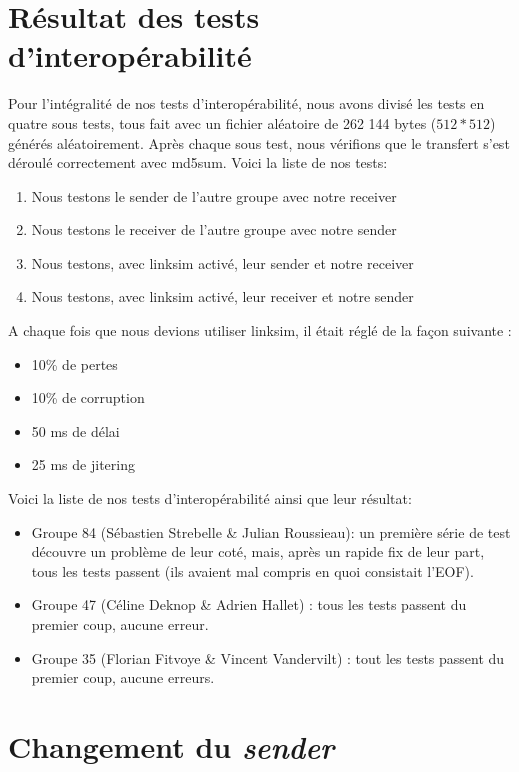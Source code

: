 \documentclass[12pt,notitlepage]{report}
\begin{document}
\begin{appendices}
\section{Résultat des tests d'interopérabilité}
	Pour l'intégralité de nos tests d'interopérabilité, nous avons divisé les tests en quatre sous tests, tous fait avec un fichier aléatoire de 262 144 bytes ($512*512$) générés aléatoirement. Après chaque sous test, nous vérifions que le transfert s'est déroulé correctement avec md5sum. Voici la liste de nos tests:
\begin{enumerate}
\item Nous testons le sender de l'autre groupe avec notre receiver
\item Nous testons le receiver de l'autre groupe avec notre sender
\item Nous testons, avec linksim activé, leur sender et notre receiver
\item Nous testons, avec linksim activé, leur receiver et notre sender
\end{enumerate}	 
	A chaque fois que nous devions utiliser linksim, il était réglé de la façon suivante : 
	\begin{itemize}
	\item 10\% de pertes
	\item 10\% de corruption
	\item 50 ms de délai
	\item 25 ms de jitering
	\end{itemize}

Voici la liste de nos tests  d'interopérabilité ainsi que leur résultat:
\begin{itemize}
\item Groupe 84 (Sébastien Strebelle \& Julian Roussieau): un première série de test découvre un problème  de leur coté, mais, après un rapide fix de leur part, tous les tests passent (ils avaient mal compris en quoi consistait l'EOF).
\item Groupe 47 (Céline Deknop \& Adrien Hallet) : tous les tests passent du premier coup, aucune erreur.
\item Groupe 35 (Florian Fitvoye \& Vincent Vandervilt) : tout les tests passent du premier coup, aucune erreurs.
\end{itemize}

\section{Changement du \textit{sender}}


\end{appendices}
\end{document}
